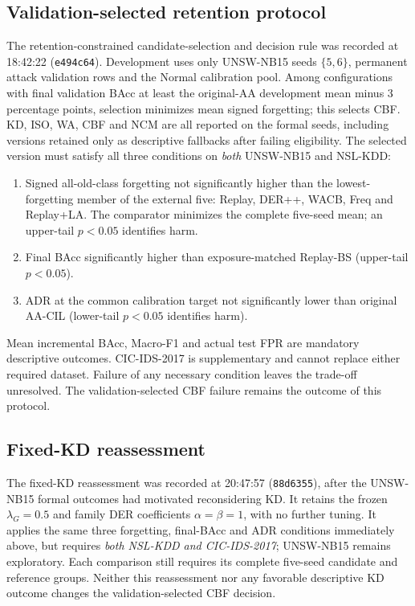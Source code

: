 \documentclass[10pt,twocolumn]{article}
\begin{document}
\subsection{Validation-selected retention protocol}\label{app:retention-protocol}
The retention-constrained candidate-selection and decision rule was recorded at 18:42:22 (\texttt{e494c64}). Development uses only UNSW-NB15 seeds $\{5,6\}$, permanent attack validation rows and the Normal calibration pool. Among configurations with final validation BAcc at least the original-AA development mean minus 3 percentage points, selection minimizes mean signed forgetting; this selects CBF. KD, ISO, WA, CBF and NCM are all reported on the formal seeds, including versions retained only as descriptive fallbacks after failing eligibility. The selected version must satisfy all three conditions on \emph{both} UNSW-NB15 and NSL-KDD:
\begin{enumerate}
\item Signed all-old-class forgetting not significantly higher than the lowest-forgetting member of the external five: Replay, DER++, WACB, Freq and Replay+LA. The comparator minimizes the complete five-seed mean; an upper-tail $p<0.05$ identifies harm.
\item Final BAcc significantly higher than exposure-matched Replay-BS (upper-tail $p<0.05$).
\item ADR at the common calibration target not significantly lower than original AA-CIL (lower-tail $p<0.05$ identifies harm).
\end{enumerate}
Mean incremental BAcc, Macro-F1 and actual test FPR are mandatory descriptive outcomes. CIC-IDS-2017 is supplementary and cannot replace either required dataset. Failure of any necessary condition leaves the trade-off unresolved. The validation-selected CBF failure remains the outcome of this protocol.

\subsection{Fixed-KD reassessment}\label{app:kd-protocol}
The fixed-KD reassessment was recorded at 20:47:57 (\texttt{88d6355}), after the UNSW-NB15 formal outcomes had motivated reconsidering KD. It retains the frozen $\lambda_G=0.5$ and family DER coefficients $\alpha=\beta=1$, with no further tuning. It applies the same three forgetting, final-BAcc and ADR conditions immediately above, but requires \emph{both NSL-KDD and CIC-IDS-2017}; UNSW-NB15 remains exploratory. Each comparison still requires its complete five-seed candidate and reference groups. Neither this reassessment nor any favorable descriptive KD outcome changes the validation-selected CBF decision.
\end{document}
